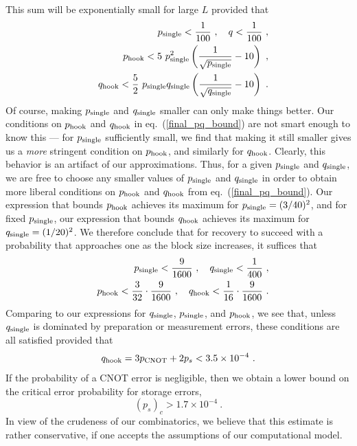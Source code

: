 This sum will be exponentially small for large $L$ provided that
\begin{eqnarray}
&&p_{\rm single}< {1\over 100}~,\quad  q< {1\over 100}~,\nonumber\\
&&p_{\rm hook} < 5~ p_{\rm single}^2\left({1\over \sqrt{p_{\rm single}}}-10\right)~,\nonumber\\
&&q_{\rm hook} < {5\over 2}~ p_{\rm single}q_{\rm single}\left({1\over \sqrt{q_{\rm single}}}-10\right)~.
\label{final_pq_bound}
\end{eqnarray}
Of course, making $p_{\rm single}$ and $q_{\rm single}$ smaller can only make things better. Our conditions on $p_{\rm hook}$ and $q_{\rm hook}$ in eq.~(\ref{final_pq_bound}) are not smart enough to know this --- for $p_{\rm single}$ sufficiently small, we find that making it still smaller gives us a {\em more} stringent condition on $p_{\rm hook}$, and similarly for $q_{\rm hook}$. Clearly, this behavior is an artifact of our approximations. Thus, for a given $p_{\rm single}$ and $q_{\rm single}$, we are free to choose any smaller values of $p_{\rm single}$ and $q_{\rm single}$ in order to obtain  more liberal conditions on $p_{\rm hook}$ and $q_{\rm hook}$ from eq.~(\ref{final_pq_bound}). Our expression that bounds $p_{\rm hook}$ achieves its maximum for $p_{\rm single}= (3/40)^2$, and for fixed $p_{\rm single}$, our expression that bounds $q_{\rm hook}$ achieves its maximum for $q_{\rm single}=(1/20)^2$. We therefore conclude that
for recovery to succeed with a probability that approaches one as the block size increases, it suffices that
\begin{eqnarray}
&&p_{\rm single}< {9\over 1600}~, \quad q_{\rm single} <{1\over 400}  ~,\nonumber\\
&&p_{\rm hook} < {3\over 32}\cdot {9\over 1600}~,\quad q_{\rm hook} < {1\over 16}\cdot {9\over 1600}~.
\end{eqnarray}
Comparing to our expressions for $q_{\rm single}$, $p_{\rm single}$, and $p_{\rm hook}$, we see that, unless $q_{\rm single}$ is dominated by preparation or measurement errors, these conditions are all satisfied provided that
\begin{equation}
\label{gate_accuracy}
q_{\rm hook}=3p_{\rm CNOT} + 2p_s < 3.5 \times 10^{-4}~.
\end{equation}
If the probability of a CNOT error is negligible, then we obtain a lower bound on the critical error probability for storage errors, 
\begin{equation}
\left(p_s\right)_c > 1.7 \times 10^{-4}~.
\end{equation}
In view of the crudeness of our combinatorics, we believe that this estimate is rather conservative, if one accepts the assumptions of our computational model.

